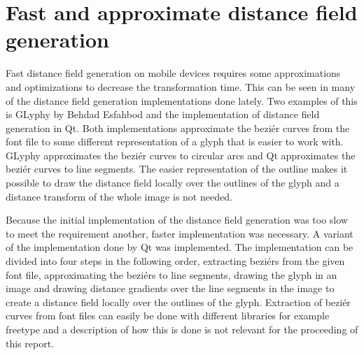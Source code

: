 \section{Fast and approximate distance field generation}
Fast distance field generation on mobile devices requires some approximations and optimizations to decrease the transformation time. This can be seen in many of the distance field generation implementations done lately. Two examples of this is GLyphy by Behdad Esfahbod and the implementation of distance field generation in Qt. Both implementations approximate the beziér curves from the font file to some different representation of a glyph that is easier to work with. GLyphy approximates the beziér curves to circular arcs and Qt approximates the beziér curves to line segments. The easier representation of the outline makes it possible to draw the distance field locally over the outlines of the glyph and a distance transform of the whole image is not needed.

Because the initial implementation of the distance field generation was too slow to meet the requirement another, faster implementation was necessary. A variant of the implementation done by Qt was implemented. The implementation can be divided into four steps in the following order, extracting beziérs from the given font file, approximating the beziérs to line segments, drawing the glyph in an image and drawing distance gradients over the line segments in the image to create a distance field locally over the outlines of the glyph. Extraction of beziér curves from font files can easily be done with different libraries for example freetype and a description of how this is done is not relevant for the proceeding of this report. 
